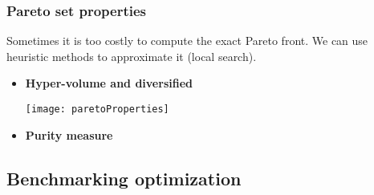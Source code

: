 \subsubsection{Pareto set properties}
Sometimes it is too costly to compute the exact Pareto front. We
can use heuristic methods to approximate it (local search).

\begin{itemize}
    \item \textbf{Hyper-volume and diversified} 
        \begin{center}
            \texttt{[image: paretoProperties]}
        \end{center}

    \item \textbf{Purity measure}
\end{itemize}


\subsection{Benchmarking optimization}

